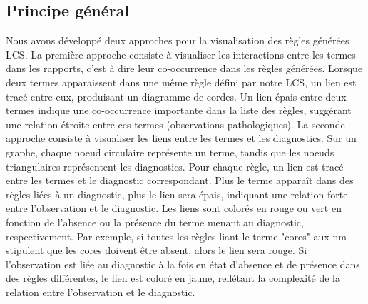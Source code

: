 \subsection{Principe général}
Nous avons développé deux approches pour la visualisation des règles générées LCS.
La première approche consiste à visualiser les interactions entre les termes dans les rapports, c'est à dire leur co-occurrence dans les règles générées. Lorsque deux termes apparaissent dans une même règle défini par notre LCS, un lien est tracé entre eux, produisant un diagramme de cordes. Un lien épais entre deux termes indique une co-occurrence importante dans la liste des règles, suggérant une relation étroite entre ces termes (observations pathologiques).
La seconde approche consiste à visualiser les liens entre les termes et les diagnostics. Sur un graphe, chaque noeud circulaire représente un terme, tandis que les noeuds triangulaires représentent les diagnostics. Pour chaque règle, un lien est tracé entre les termes et le diagnostic correspondant. Plus le terme apparaît dans des règles liées à un diagnostic, plus le lien sera épais, indiquant une relation forte entre l'observation et le diagnostic. Les liens sont colorés en rouge ou vert en fonction de l'absence ou la présence du terme menant au diagnostic, respectivement. Par exemple, si toutes les règles liant le terme "cores" aux \gls{nm} stipulent que les cores doivent être absent, alors le lien sera rouge. Si l'observation est liée au diagnostic à la fois en état d'absence et de présence dans des règles différentes, le lien est coloré en jaune, reflétant la complexité de la relation entre l'observation et le diagnostic.
